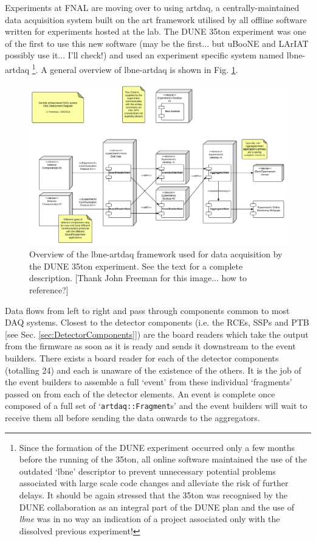 Experiments at FNAL are moving over to using artdaq, a centrally-maintained data acquisition system built on the art framework utilised by all offline software written for experiments hosted at the lab.  The DUNE 35ton experiment was one of the first to use this new software (may be the first... but uBooNE and LArIAT possibly use it... I'll check!) and used an experiment specific system named lbne-artdaq \footnote{Since the formation of the DUNE experiment occurred only a few months before the running of the 35ton, all online software maintained the use of the outdated `lbne' descriptor to prevent unnecessary potential problems associated with large scale code changes and alleviate the risk of further delays.  It should be again stressed that the 35ton was recognised by the DUNE collaboration as an integral part of the DUNE plan and the use of \textit{lbne} was in no way an indication of a project associated only with the dissolved previous experiment!}.  A general overview of lbne-artdaq is shown in Fig. \ref{fig:lbne-artdaq}.

\begin{figure}[ht]
  \centering
  \includegraphics[width=12cm]{lbne-artdaq.png}
  \caption{Overview of the lbne-artdaq framework used for data acquisition by the DUNE 35ton experiment.  See the text for a complete description.  [Thank John Freeman for this image... how to reference?]}
  \label{fig:lbne-artdaq}
\end{figure}

Data flows from left to right and pass through components common to most DAQ systems.  Closest to the detector components (i.e. the RCEs, SSPs and PTB [see Sec. \ref{sec:DetectorComponents}]) are the board readers which take the output from the firmware as soon as it is ready and sends it downstream to the event builders.  There exists a board reader for each of the detector components (totalling 24) and each is unaware of the existence of the others.  It is the job of the event builders to assemble a full `event' from these individual `fragments' passed on from each of the detector elements.  An event is complete once composed of a full set of `\texttt{artdaq::Fragment}s' and the event builders will wait to receive them all before sending the data onwards to the aggregators.

